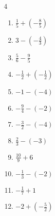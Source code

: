 \begin{multicols}{4}
\begin{enumerate}

  \item $\displaystyle \frac{1}{5} + \left(-\frac{8}{5}\right)$


  \item $\displaystyle 3 - \left(-\frac{4}{3}\right)$


  \item $\displaystyle \frac{5}{6} - \frac{9}{5}$


  \item $\displaystyle -\frac{1}{2} + \left(-\frac{1}{2}\right)$

        \phantom{$\displaystyle =-1$}

  \item $\displaystyle -1 - \left(-4\right)$

        \phantom{$\displaystyle =3$}

  \item $\displaystyle -\frac{9}{4} - \left(-2\right)$


\columnbreak %

  \item $\displaystyle -\frac{3}{2} - \left(-4\right)$


  \item $\displaystyle \frac{2}{3} - \left(-3\right)$


  \item $\displaystyle \frac{10}{9} + 6$


  \item $\displaystyle -\frac{1}{3} - \left(-2\right)$


  \item $\displaystyle -\frac{1}{7} + 1$


  \item $\displaystyle -2 + \left(-\frac{5}{2}\right)$


\end{enumerate}
\end{multicols}
